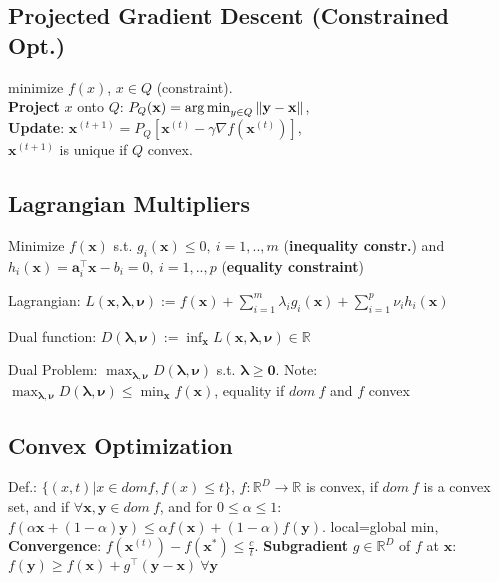 \subsection*{Projected Gradient Descent (Constrained Opt.)}
minimize $f(x)$, $x \in Q$ (constraint).\\
\textbf{Project} $x$ onto $Q$: $P_Q(\mathbf{x}) = \operatorname*{arg\,min}_{y \in Q} \|\mathbf{y} - \mathbf{x}\|$,\\
\textbf{Update}: $\mathbf{x}^{(t+1)} = P_Q[\mathbf{x}^{(t)} - \gamma \nabla f(\mathbf{x}^{(t)})]$,\\
$\mathbf{x}^{(t+1)}$ is unique if $Q$ convex.

\subsection*{Lagrangian Multipliers}
Minimize  $f(\mathbf{x})$ s.t. $g_i(\mathbf{x}) \leq 0,\ i = 1, .., m$ (\textbf{inequality constr.}) and $h_i(\mathbf{x}) = \mathbf{a}_i^\top \mathbf{x} - b_i = 0,\ i = 1, .., p$ (\textbf{equality constraint})
\begin{compactdesc}
	\item[Lagrangian:] $L(\mathbf{x}, \boldsymbol{\lambda}, \boldsymbol{\nu}) := f(\mathbf{x}) + \sum_{i=1}^m \lambda_i g_i(\mathbf{x}) + \sum_{i=1}^p \nu_i h_i(\mathbf{x})$
	\item[Dual function:] $D(\boldsymbol{\lambda}, \boldsymbol{\nu}) := \inf_{\mathbf{x}} L(\mathbf{x}, \boldsymbol{\lambda}, \boldsymbol{\nu}) \in \mathbb{R}$
	\item[Dual Problem:] $\max_{\boldsymbol{\lambda}, \boldsymbol{\nu}} D(\boldsymbol{\lambda}, \boldsymbol{\nu})$ s.t. $\boldsymbol{\lambda} \geq \mathbf{0}$. Note: $\max_{\boldsymbol{\lambda}, \boldsymbol{\nu}} D(\boldsymbol{\lambda}, \boldsymbol{\nu}) \le \min_\mathbf{x}{f(\mathbf{x})}$, equality if $dom\ f$ and $f$ convex
\end{compactdesc}

\subsection*{Convex Optimization}
Def.: $\{(x,t)|x \in dom f, f(x) \leq t\}$, $f : \mathbb{R}^D \rightarrow \mathbb{R}$ is convex, if $dom\ f$ is a convex set, and if $\forall \mathbf{x}, \mathbf{y} \in dom\ f$, and for $0 \leq \alpha \leq 1$: $f(\alpha \mathbf{x} + (1 - \alpha)\mathbf{y}) \leq \alpha f(\mathbf{x}) + (1-\alpha)f(\mathbf{y})$. local=global min, \textbf{Convergence}: $f(\mathbf{x}^{(t)}) - f(\mathbf{x}^*) \le \frac{c}{t}$.
\textbf{Subgradient} $g \in \mathbb{R}^D$ of $f$ at $\mathbf{x}$: $f(\mathbf{y}) \geq f(\mathbf{x}) + g^\top(\mathbf{y}-\mathbf{x}) \ \forall \mathbf{y}$

